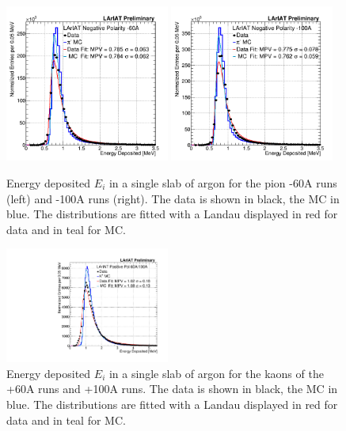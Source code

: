 \begin{figure}[htb]
\centering
\includegraphics[width=0.48\textwidth]{Chapter-5/Images/DepEnergy_Fit_v4.png}
\includegraphics[width=0.48\textwidth]{Chapter-5/Images/DepEnergy_Fit_v4100A.png}
\caption[]{ Energy deposited  $E_{i}$ in a single slab of argon for the pion -60A runs (left) and -100A runs (right).  The data is shown in black, the MC in blue. The distributions are fitted with a Landau displayed in red for data and in teal for MC. } \label{fig:EnergyDeposited}
\end{figure}

\begin{figure}[htb]
\centering
\includegraphics[width=0.48\textwidth]{Chapter-5/Images/KaonEdep.pdf}
\caption[]{ Energy deposited  $E_{i}$ in a single slab of argon for the kaons of the +60A runs and +100A runs.  The data is shown in black, the MC in blue. The distributions are fitted with a Landau displayed in red for data and in teal for MC. } \label{fig:EnergyDepositedK}
\end{figure}




